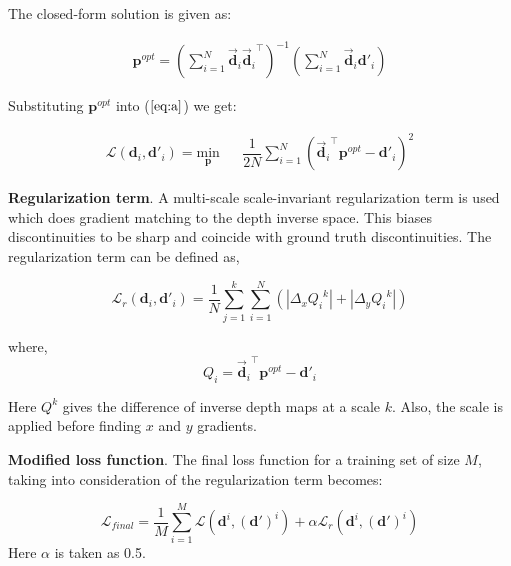 \documentclass[journal]{IEEEtran}
\begin{document}
The closed-form solution is given as:

\begin{equation}
\begin{aligned}
 \mathbf{p}^{opt}= (\sum_{i=1}^{\mathit{N}}\vec{\mathbf{d}}_{i}{\vec{\mathbf{d}}_{i}}^\intercal)^{-1}(\sum_{i=1}^{\mathit{N}}\vec{\mathbf{d}}_{i}\mathbf{d'}_{i})
\end{aligned}
\end{equation}

Substituting  $\mathbf{p}^{opt}$ into ($\ref{eq:a}$) we get:

\begin{equation}\label{eq:2}
\begin{aligned}
\mathcal{L} (\mathbf{d}_{i},\mathbf{d'}_{i}) = \underset{\mathbf{p}}{\text{min}} && \dfrac{1}{2\mathit{N}} \sum_{i=1}^{\mathit{N}}({\vec{\mathbf{d}}_{i}}^\intercal\mathbf{p}^{opt}-\mathbf{d'}_{i})^2
\end{aligned}
\end{equation}

\textbf{Regularization term}. A multi-scale scale-invariant regularization term is used which does gradient matching to the depth inverse space. This biases discontinuities to be sharp and coincide with ground truth discontinuities. 
The regularization term can be defined as,

\begin{equation}
\mathcal{L}_{r} (\mathbf{d}_{i},\mathbf{d'}_{i}) = \dfrac{1}{\mathit{N}}\sum_{j=1}^{k}\sum_{i=1}^{\mathit{N}}(|\Delta_{x} {Q_{i}}^k|+|\Delta_{y} {Q_{i}}^k|)
\end{equation}

where,
\begin{equation}
Q_{i}={\vec{\mathbf{d}}_{i}}^\intercal\mathbf{p}^{opt}-\mathbf{d'}_{i}
\end{equation}

Here $Q^{k}$ gives the difference of inverse depth maps at a scale $k$. Also, the scale is applied before finding $x$ and $y$ gradients.

\textbf{Modified loss function}. The final loss function for a training set of size $M$, taking into consideration of the regularization term becomes:

\begin{equation}
\mathcal{L}_{final} = \dfrac{1}{M}\sum_{i=1}^{M}\mathcal{L} (\mathbf{d}^{i},(\mathbf{d'})^{i})+ \alpha \mathcal{L}_{r} (\mathbf{d}^{i},(\mathbf{d'})^{i})
\end{equation}
Here $ \alpha  $ is taken as 0.5.
\end{document}
